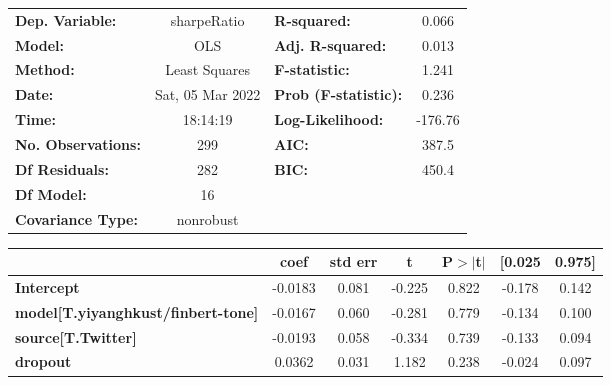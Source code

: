 \begin{center}
\begin{tabular}{lclc}
\toprule
\textbf{Dep. Variable:}                    &   sharpeRatio    & \textbf{  R-squared:         } &     0.066   \\
\textbf{Model:}                            &       OLS        & \textbf{  Adj. R-squared:    } &     0.013   \\
\textbf{Method:}                           &  Least Squares   & \textbf{  F-statistic:       } &     1.241   \\
\textbf{Date:}                             & Sat, 05 Mar 2022 & \textbf{  Prob (F-statistic):} &    0.236    \\
\textbf{Time:}                             &     18:14:19     & \textbf{  Log-Likelihood:    } &   -176.76   \\
\textbf{No. Observations:}                 &         299      & \textbf{  AIC:               } &     387.5   \\
\textbf{Df Residuals:}                     &         282      & \textbf{  BIC:               } &     450.4   \\
\textbf{Df Model:}                         &          16      & \textbf{                     } &             \\
\textbf{Covariance Type:}                  &    nonrobust     & \textbf{                     } &             \\
\bottomrule
\end{tabular}
\begin{tabular}{lcccccc}
                                           & \textbf{coef} & \textbf{std err} & \textbf{t} & \textbf{P$> |$t$|$} & \textbf{[0.025} & \textbf{0.975]}  \\
\midrule
\textbf{Intercept}                         &      -0.0183  &        0.081     &    -0.225  &         0.822        &       -0.178    &        0.142     \\
\textbf{model[T.yiyanghkust/finbert-tone]} &      -0.0167  &        0.060     &    -0.281  &         0.779        &       -0.134    &        0.100     \\
\textbf{source[T.Twitter]}                 &      -0.0193  &        0.058     &    -0.334  &         0.739        &       -0.133    &        0.094     \\
\textbf{dropout}                           &       0.0362  &        0.031     &     1.182  &         0.238        &       -0.024    &        0.097     \\

\end{tabular}
\end{center}
